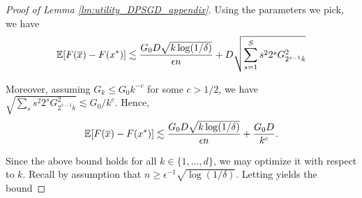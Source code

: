 \begin{proof}[Proof of Lemma \ref{lm:utility_DPSGD_appendix}]
Using the parameters we pick, we have
\[
\mathbb{E} [F(\overline{x})- F(x^{*})]\lesssim \frac{G_{0}D\sqrt{k\log(1/\delta)}}{\epsilon n}+D \sqrt{\sum_{s=1}^{S} s^2 2^{s}G_{2^{s-1}k}^{2}}
\]

Moreover,
assuming $G_{k}\leq G_0 k^{-c}$ for some $c>1/2$, we have $\sqrt{\sum_s s^2 2^sG_{2^{s-1}k}^2}\lesssim G_0 / k^{c}$. 
Hence,
\begin{align*}
    \mathbb{E} [F(\overline{x})- F(x^{*})]\lesssim\frac{G_{0}D\sqrt{k\log(1/\delta)}}{\epsilon n}+\frac{G_0D}{k^c}.
\end{align*}




Since the above bound holds for all $k \in \{1, \dots, d\}$, we may optimize it with respect to $k$.
Recall by assumption that $ n\geq \epsilon^{-1} \sqrt{\log(1/\delta)}$. 
Letting
yields the bound
\end{proof}


